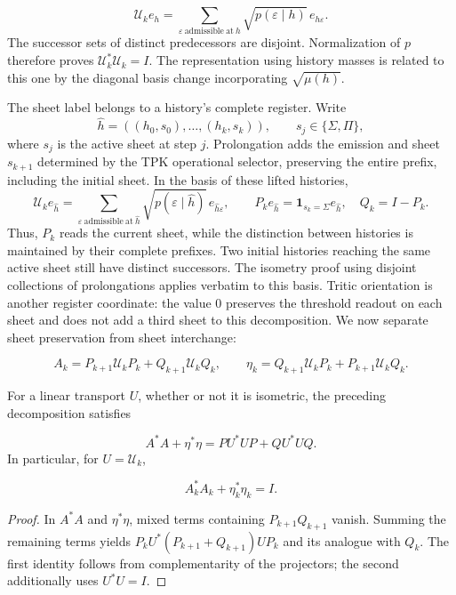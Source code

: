 \[
\mathcal U_ke_h=
\sum_{\varepsilon\ \mathrm{admissible\ at}\ h}
\sqrt{p(\varepsilon\mid h)}\,e_{h\varepsilon}.
\]
The successor sets of distinct predecessors are disjoint. Normalization of \(p\) therefore proves \(\mathcal U_k^*\mathcal U_k=I\). The representation using history masses is related to this one by the diagonal basis change incorporating \(\sqrt{\mu(h)}\).

The sheet label belongs to a history's complete register. Write
\[
\widehat h=((h_0,s_0),\ldots,(h_k,s_k)),\qquad
s_j\in\{\Sigma,\Pi\},
\]
where \(s_j\) is the active sheet at step \(j\). Prolongation adds the emission and sheet \(s_{k+1}\) determined by the TPK operational selector, preserving the entire prefix, including the initial sheet. In the basis of these lifted histories,
\[
\mathcal U_ke_{\widehat h}
=\sum_{\varepsilon\ \mathrm{admissible\ at}\ \widehat h}
\sqrt{p(\varepsilon\mid\widehat h)}\,e_{\widehat h\varepsilon},
\qquad
P_ke_{\widehat h}=\mathbf1_{s_k=\Sigma}e_{\widehat h},\quad
Q_k=I-P_k.
\]
Thus, \(P_k\) reads the current sheet, while the distinction between histories is maintained by their complete prefixes. Two initial histories reaching the same active sheet still have distinct successors. The isometry proof using disjoint collections of prolongations applies verbatim to this basis.
Tritic orientation is another register coordinate: the value \(0\) preserves the threshold readout on each sheet and does not add a third sheet to this decomposition. We now separate sheet preservation from sheet interchange:

\[
A_k=P_{k+1}\mathcal U_kP_k+Q_{k+1}\mathcal U_kQ_k,
\qquad
\eta_k=Q_{k+1}\mathcal U_kP_k+P_{k+1}\mathcal U_kQ_k.
\]
\begin{proposition}
\label{iv:cont:gram}
For a linear transport \(U\), whether or not it is isometric, the preceding decomposition satisfies

\[
A^*A+\eta^*\eta=PU^*UP+QU^*UQ.
\]
In particular, for \(U=\mathcal U_k\),

\[
A_k^*A_k+\eta_k^*\eta_k=I.
\]
\end{proposition}
\begin{proof}
In \(A^*A\) and \(\eta^*\eta\), mixed terms containing \(P_{k+1}Q_{k+1}\) vanish. Summing the remaining terms yields \(P_kU^*(P_{k+1}+Q_{k+1})UP_k\) and its analogue with \(Q_k\). The first identity follows from complementarity of the projectors; the second additionally uses \(U^*U=I\).
\end{proof}


